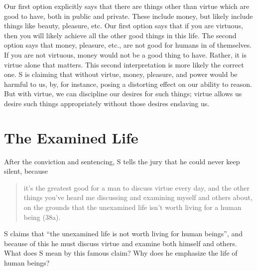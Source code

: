 \documentclass[oneside]{article}
\begin{document}
Our first option explicitly says that there are things other than virtue which are good to have, both in public and private. These include money, but likely include things like beauty, pleasure, etc. Our first option says that if you are virtuous, then you will likely achieve all the other good things in this life. The second option says that money, pleasure, etc., are not good for humans in of themselves. If you are not virtuous, money would not be a good thing to have. Rather, it is virtue alone that matters. This second interpretation is more likely the correct one. S is claiming that without virtue, money, pleasure, and power would be harmful to us, by, for instance, posing a distorting effect on our ability to reason. But with virtue, we can discipline our desires for such things; virtue allows us desire such things appropriately without those desires enslaving us. 

\section*{The Examined Life}

After the conviction and sentencing, S tells the jury that he could never keep silent, because
\begin{quote}
it's the greatest good for a man to discuss virtue every day, and the other things you've heard me discussing and examining myself and others about, on the grounds that the unexamined life isn't worth living for a human being (38a).
\end{quote}
S claims that ``the unexamined life is not worth living for human beings'', and because of this he must discuss virtue and examine both himself and others. What does S mean by this famous claim? Why does he emphasize the life of human beings? 


\end{document}
